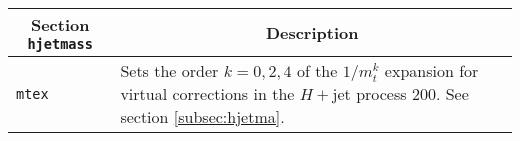	\begin{longtable}{p{1.5cm}p{12cm}}
		\toprule
		\multicolumn{1}{c}{{\textbf{Section} \texttt{hjetmass}}} & \multicolumn{1}{c}{{\textbf{Description}}} \\ 
		\midrule
		{\tt mtex} &
		Sets the order $k=0,2,4$ of the $1/m_t^k$ expansion for virtual corrections in the $H+$jet process 200. See 
		section \ref{subsec:hjetma}. \\
		\bottomrule
	\end{longtable}
